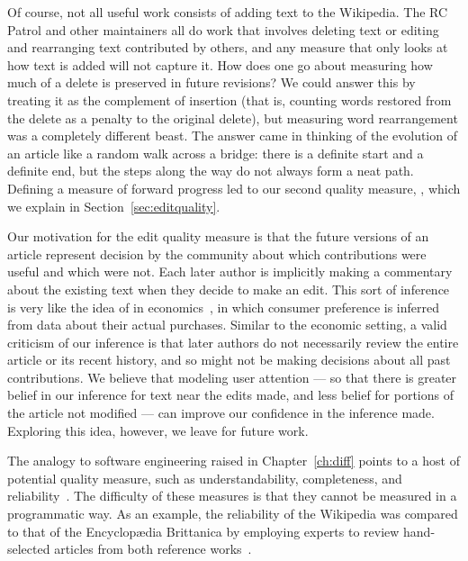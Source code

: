 Of course, not all useful work consists of adding text to the Wikipedia.
The RC Patrol and other maintainers all do work that involves
deleting text or editing and rearranging text contributed by others,
and any measure that only looks at how text is added will not capture it.
How does one go about measuring how much of a delete is preserved
in future revisions?
We could answer this by treating it as the complement of insertion
(that is, counting words restored from the delete as a
penalty to the original delete), but measuring word rearrangement
was a completely different beast.
The answer came in thinking of the evolution of an article
like a random walk across a bridge: there is a definite start and a
definite end, but the steps along the way do not always form a neat path.
Defining a measure of forward progress led to our second
quality measure, , which we explain in
Section~\ref{sec:editquality}.

Our motivation for the edit quality measure is that the future
versions of an article represent decision by the community about
which contributions were useful and which were not.
Each later author is implicitly making a commentary about the
existing text when they decide to make an edit.
This sort of inference is very like the idea of
 in economics~\cite{Samuelson1938,Varian2006},
in which consumer preference is inferred from data about their
actual purchases.
Similar to the economic setting, a valid criticism of our inference
is that later authors do not necessarily review the entire article
or its recent history, and so might not be making decisions about
all past contributions.
We believe that modeling user attention --- so that there is greater
belief in our inference for text near the edits made, and less belief
for portions of the article not modified ---
can improve our confidence in the inference made.
Exploring this idea, however, we leave for future work.

The analogy to software engineering raised in Chapter~\ref{ch:diff}
points to a host of potential quality measure, such as
understandability, completeness, and reliability~\cite{wiki:SoftwareQuality}.
The difficulty of these measures is that they cannot be measured
in a programmatic way.
As an example, the reliability of the Wikipedia was compared to that
of the Encyclop{\ae}dia Brittanica by employing experts to review
hand-selected articles from both reference works~\cite{Giles2005}.

